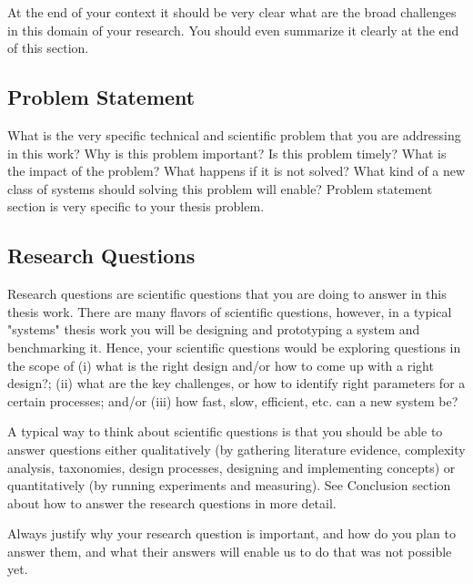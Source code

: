 \documentclass{article}
\begin{document}
At the end of your context it should be very clear what are the broad challenges in this domain of your research. You should even summarize it clearly at the end of this section. 

\subsection{Problem Statement}
What is the very specific technical and scientific problem that you are addressing in this work? Why is this problem important? Is this problem timely? What is the impact of the problem? What happens if it is not solved? What kind of a new class of systems should solving this problem will enable? Problem statement section is very specific to your thesis problem. 

\subsection{Research Questions}

Research questions are scientific questions that you are doing to answer in this thesis work. There are many flavors of scientific questions, however, in a typical "systems" thesis work you will be designing and prototyping a system and benchmarking it. Hence, your scientific questions would be exploring questions in the scope of (i) what is the right design and/or how to come up with a right design?; (ii) what are the key challenges, or how to identify right parameters for a certain processes; and/or (iii) how fast, slow, efficient, etc. can a new system be? 

A typical way to think about scientific questions is that you should be able to answer questions either qualitatively (by gathering literature evidence, complexity analysis, taxonomies, design processes, designing and implementing concepts) or quantitatively (by running experiments and measuring). See Conclusion section about how to answer the research questions in more detail. 

Always justify why your research question is important, and how do you plan to answer them, and what their answers will enable us to do that was not possible yet.  
\end{document}
